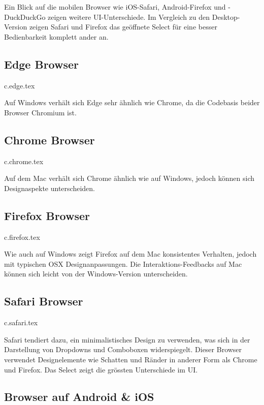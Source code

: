 Ein Blick auf die mobilen Browser wie iOS-Safari, Android-Firefox und -DuckDuckGo zeigen weitere UI-Unterschiede.
Im Vergleich zu den Desktop-Version zeigen Safari und Firefox das geöffnete Select für eine besser Bedienbarkeit komplett ander an.


\clearpage
\subsection{Edge Browser}
\label{sec:edgeBrowser}

{c.edge.tex}

Auf Windows verhält sich Edge sehr ähnlich wie Chrome, da die Codebasis beider Browser Chromium ist.


\clearpage
\subsection{Chrome Browser}
\label{sec:chromeBrowser}

{c.chrome.tex}

Auf dem Mac verhält sich Chrome ähnlich wie auf Windows, jedoch können sich Designaspekte unterscheiden. 


\clearpage
\subsection{Firefox Browser}
\label{sec:firefoxBrowser}

{c.firefox.tex}

Wie auch auf Windows zeigt Firefox auf dem Mac konsistentes Verhalten, jedoch mit typischen OSX Designanpassungen. 
Die Interaktions-Feedbacks auf Mac können sich leicht von der Windows-Version unterscheiden.


\clearpage
\subsection{Safari Browser}
\label{sec:safariBrowser}

{c.safari.tex}

Safari tendiert dazu, ein minimalistisches Design zu verwenden, was sich in der Darstellung von Dropdowns und Comboboxen widerspiegelt.
Dieser Browser verwendet Designelemente wie Schatten und Ränder in anderer Form als Chrome und Firefox.
Das Select zeigt die grössten Unterschiede im UI.


\clearpage
\subsection{Browser auf Android \& iOS}
\label{sec:mobileBrowser}

